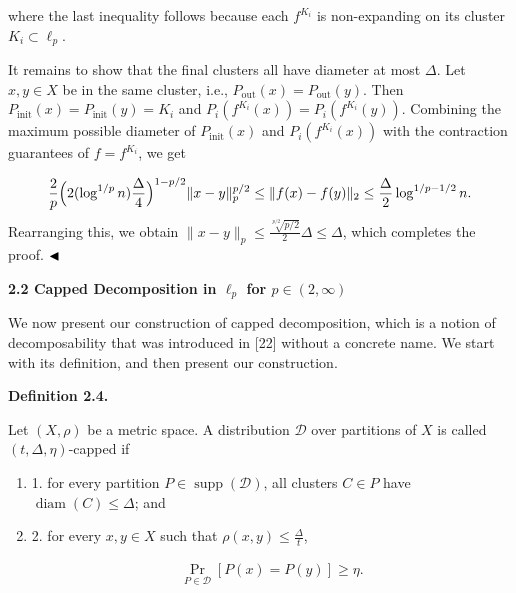where the last inequality follows because each $f^{K_{i}}$ is non-expanding on its cluster $K_{i}\subset\ell_{p}$.
\par
\par
It remains to show that the final clusters all have diameter at most $\Delta$. Let $x,y\in X$ be in the same cluster, i.e., $P_{\text{out}}(x)=P_{\text{out}}(y)$. Then $P_{\text{init}}(x)=P_{\text{init}}(y)=K_{i}$ and $P_{i}(f^{K_{i}}(x))=P_{i}(f^{K_{i}}(y))$. Combining the maximum possible diameter of $P_{\text{init}}(x)$ and $P_{i}(f^{K_{i}}(x))$ with the contraction guarantees of $f=f^{K_{i}}$, we get
\par
\[\begin{aligned}
\frac{2}{p}\Big{(}2(\log^{1/p}{n})\frac{\Delta}{4}\Big{)}^{1-p/2}\|x-y\|_{p}^{%
p/2}\leq\|f(x)-f(y)\|_{2}\leq\frac{\Delta}{2}\log^{1/p-1/2}{n}.
\end{aligned}\]
Rearranging this, we obtain $\|x-y\|_{p}\leq\frac{\sqrt[p/2]{p/2}}{2}\Delta\leq\Delta$, which completes the proof. $\hfill\blacktriangleleft$
\par
\par
\par
\par
\par\medskip\noindent\textbf{2.2 Capped Decomposition in $\ell_{p}$ for $p\in(2,\infty)$}\par
We now present our construction of capped decomposition, which is a notion of decomposability that was introduced in [22] without a concrete name. We start with its definition, and then present our construction.
\par
\par
\par\medskip\noindent\textbf{Definition 2.4.}\par
Let $(X,\rho)$ be a metric space. A distribution $\mathcal{D}$ over partitions of $X$ is called $(t,\Delta,\eta)$-capped if
\par
\begin{enumerate}
\item  1. 
for every partition $P\in\operatorname{supp}(\mathcal{D})$, all clusters $C\in P$ have $\operatorname{diam}(C)\leq\Delta$; and
\par
\par
\item  2. 
for every $x,y\in X$ such that $\rho(x,y)\leq\frac{\Delta}{t}$,
\par
\[\begin{aligned}
\Pr_{P\in\mathcal{D}}[P(x)=P(y)]\geq\eta.
\end{aligned}\]
\par
\end{enumerate}
